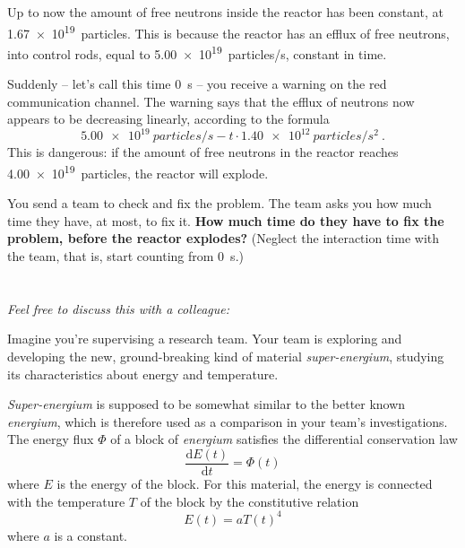 \documentclass[a4paper,12pt,%
onecolumn,oneside,%
british%
]{memoir}
\newcommand*{\di}{\mathrm{d}}%
\renewcommand*{\|}[1][]{\nonscript\:#1\vert\nonscript\:\mathopen{}}
\newcommand*{\yE}{E}
\newcommand*{\yH}{\varPhi}%
\newcommand*{\yT}{T}%
\begin{document}
\begin{enumerate}[exerc,itemsep=1em]
  Up to now the amount of free neutrons inside the reactor has been constant, at \qty{1.67e19}{particles}. This is because the reactor has an efflux of free neutrons, into control rods, equal to \qty{5.00e19}{particles/s}, constant in time.

  Suddenly -- let's call this time \qty{0}{s} -- you receive a warning on the red communication channel. The warning says that the efflux of neutrons now appears to be decreasing linearly, according to the formula
  \begin{equation*}
    \qty{5.00e19}{particles/s} - t\cdot\qty{1.40e12}{particles/s^{2}} \ .
  \end{equation*}
  This is dangerous: if the amount of free neutrons in the reactor reaches \qty{4.00e19}{particles}, the reactor will explode.

  You send a team to check and fix the problem. The team asks you how much time they have, at most, to fix it. \textbf{How much time do they have to fix the problem, before the reactor explodes?} (Neglect the interaction time with the team, that is, start counting from \qty{0}{s}.)

\end{enumerate}






\section{}
\label{sec:change_bal_or_const}

\emph{Feel free to discuss this with a colleague:}

\smallskip

Imagine you're supervising a research team. Your team is exploring and developing the new, ground-breaking kind of material \emph{super-energium}, studying its characteristics about energy and temperature.

\emph{Super-energium} is supposed to be somewhat similar to the better known \emph{energium}, which is therefore used as a comparison in your team's investigations. The energy flux $\yH$ of a block of \emph{energium} satisfies the differential conservation law
\begin{equation}\label{eq:energy_block}
  \frac{\di\yE(t)}{\di t} = \yH(t)
\end{equation}
where $\yE$ is the energy of the block. For this material, the energy is connected with the temperature $\yT$ of the block by the constitutive relation
\begin{equation}\label{eq:const_block}
  \yE(t) = a \yT(t)^{4}
\end{equation}
where $a$ is a constant.
\end{document}
